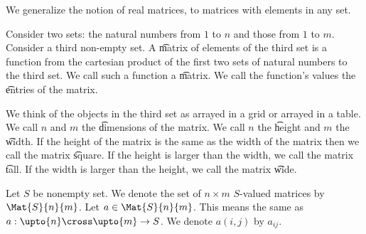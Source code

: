 
 We generalize the notion of real matrices, to matrices with elements in any set.


Consider two sets: the natural numbers from $1$ to $n$ and those from $1$ to $m$.
Consider a third non-empty set.
A \t{matrix of} elements of the third set is a function from the cartesian product of the first two sets of natural numbers to the third set.
We call such a function a \t{matrix}.
We call the function's values the \t{entries} of the matrix.

We think of the objects in the third set as arrayed in a grid or arrayed in a table.
We call $n$ and $m$ the \t{dimensions} of the matrix.
We call $n$ the \t{height} and $m$ the \t{width}.
If the height of the matrix is the same as the width of the matrix then we call the matrix \t{square}.
If the height is larger than the width, we call the matrix \t{tall}.
If the width is larger than the height, we call the matrix \t{wide}.


Let $S$ be nonempty set.
We denote the set of $n \times m$ $S$-valued matrices by $\Mat{S}{n}{m}$.
Let $a \in \Mat{S}{n}{m}$.
This means the same as $a: \upto{n} \cross \upto{m} \to S$.
We denote $a(i, j)$ by $a_{ij}$.

\blankpage
